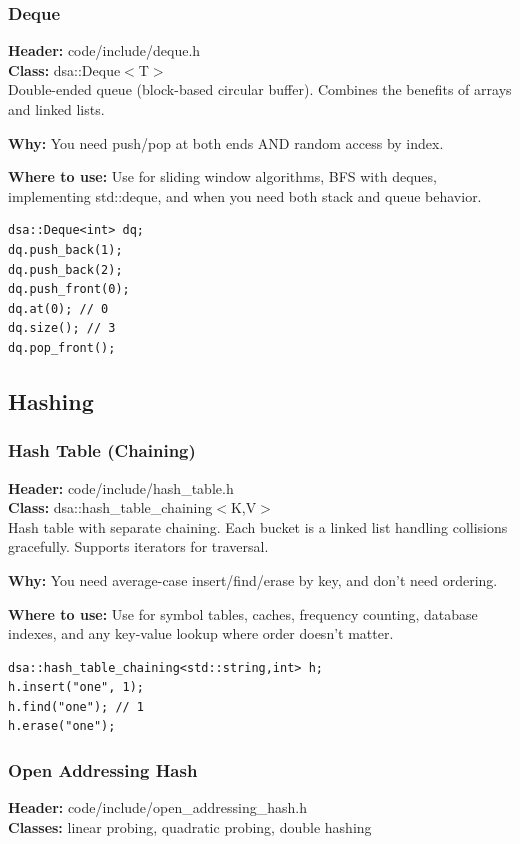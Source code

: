 \documentclass[11pt]{article}
\begin{document}
\subsubsection{Deque}
\textbf{Header:} code/include/deque.h\\
\textbf{Class:} dsa::Deque$<$T$>$\\

Double-ended queue (block-based circular buffer). Combines the benefits of arrays and linked lists.

\textbf{Why:} You need push/pop at both ends AND random access by index. \par \textbf{Where to use:} Use for sliding window algorithms, BFS with deques, implementing std::deque, and when you need both stack and queue behavior.

\begin{lstlisting}
dsa::Deque<int> dq;
dq.push_back(1);
dq.push_back(2);
dq.push_front(0);
dq.at(0); // 0
dq.size(); // 3
dq.pop_front();
\end{lstlisting}

\subsection{Hashing}

\subsubsection{Hash Table (Chaining)}
\textbf{Header:} code/include/hash\_table.h\\
\textbf{Class:} dsa::hash\_table\_chaining$<$K,V$>$\\

Hash table with separate chaining. Each bucket is a linked list handling collisions gracefully. Supports iterators for traversal.

\textbf{Why:} You need average-case insert/find/erase by key, and don't need ordering. \par \textbf{Where to use:} Use for symbol tables, caches, frequency counting, database indexes, and any key-value lookup where order doesn't matter.

\begin{lstlisting}
dsa::hash_table_chaining<std::string,int> h;
h.insert("one", 1);
h.find("one"); // 1
h.erase("one");
\end{lstlisting}

\subsubsection{Open Addressing Hash}
\textbf{Header:} code/include/open\_addressing\_hash.h\\
\textbf{Classes:} linear probing, quadratic probing, double hashing\\
\end{document}
